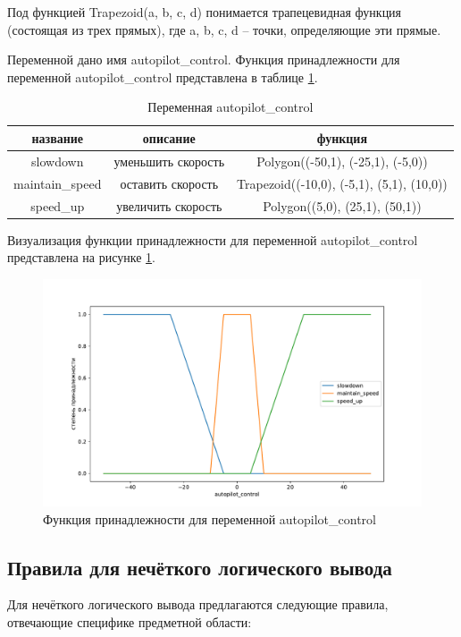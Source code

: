 \documentclass[12pt]{report}
\begin{document}
Под функцией Trapezoid(a, b, c, d) понимается трапецевидная функция (состоящая из трех прямых), где a, b, c, d -- точки, определяющие эти прямые. 

Переменной дано имя autopilot\_control. 
Функция принадлежности для переменной autopilot\_control представлена в таблице \ref{table:vel}.

\begin{table} [h!]
	\caption{Переменная autopilot\_control} 
 \label{table:vel}
	\begin{center}
	\begin{tabular}{|c c c|}
\hline название  & описание  & функция \\
\hline slowdown & уменьшить скорость & Polygon((-50,1), (-25,1), (-5,0)) \\
\hline maintain\_speed & оставить скорость & Trapezoid((-10,0), (-5,1), (5,1), (10,0)) \\
\hline speed\_up & увеличить скорость & Polygon((5,0), (25,1), (50,1)) \\
\hline
	\end{tabular}
	\end{center}
\end{table}

Визуализация функции принадлежности для переменной autopilot\_control представлена на рисунке \ref{fig:var_vel}.

\begin{figure}[h!]
  \centering
  \includegraphics[scale = 0.65]{variable_autopilot_control.pdf}
  \caption{Функция принадлежности для переменной autopilot\_control}
  \label{fig:var_vel}
\end{figure}


\subsection{Правила для нечёткого логического вывода}
Для нечёткого логического вывода предлагаются следующие правила, отвечающие специфике предметной области:
\end{document}
